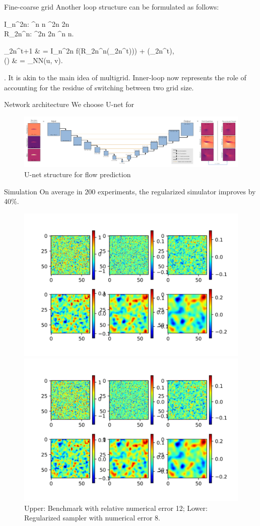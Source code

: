 \documentclass{beamer}
\begin{document}
\begin{frame}{Fine-coarse grid}
	Another loop structure can be formulated as follows:
	\bequn
	\begin{aligned}
	I_n^{2n}: \mbR^{n \times n} \rightarrow \mbR^{2n \times 2n}			\\
	R_{2n}^{n}: \mbR^{2n \times 2n} \rightarrow \mbR^{n \times n}.
	\end{aligned}
\eequn
	\bequ
	\lbb\begin{aligned}
		\mfu_{2n}^{t+1} & = I_n^{2n} \circ f(R_{2n}^{n}(\mfu_{2n}^t))) + \wht \mfR(\mfu_{2n}^t),		\\
		\wht \mfR(\mfu) & = \phi_{NN}(u, v).
	\end{aligned}\right.
\eequ
	It is akin to the main idea of multigrid. Inner-loop now represents the role of accounting for the residue of switching between two grid size.
\end{frame}


\begin{frame}{Network architecture}
	We choose U-net for 
	\begin{figure}[H]
          \centering
          \centerline{\includegraphics[width=1.1\linewidth]{fig/Unet.png}}
          \caption{U-net structure for flow prediction\footnotemark}
\end{figure}
\end{frame}


\begin{frame}{Simulation}
	On average in $200$ experiments, the regularized simulator improves by 40\%.
	\begin{figure}[H]
          \centering
          \centerline{\includegraphics[width=0.4\linewidth]{fig/RD2-64-bm.jpg}}
          \centerline{\includegraphics[width=0.4\linewidth]{fig/RD2-64-reg.jpg}}
          \caption{Upper: Benchmark with relative numerical error 12; Lower: Regularized sampler with numerical error 8.}
\end{figure}
\end{frame}
\end{document}
